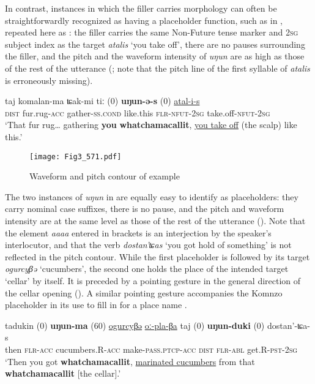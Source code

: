 \documentclass[output=paper]{langscibook}
\begin{document}
In contrast, instances in which the filler carries morphology can often be straightforwardly recognized as having a placeholder function, such as in , repeated here as : the filler carries the same Non-Future tense marker and 2\textsc{sg} subject index as the target \textit{atalis} ‘you take off’, there are no pauses surrounding the filler, and the pitch and the waveform intensity of \textit{uŋun} are as high as those of the rest of the utterance (; note that the pitch line of the first syllable of \textit{atalis} is erroneously missing). 


\ea \label{ex:pakendorf:6}
\gll taj
	komalan-ma
	ʨak-mi
	tiː
	\textup{(0)}
	\textbf{uŋun-ə{}-s}
	\textup{(0)}
	\uline{atal-i-s}\\
	\textsc{dist}
	fur.rug-\textsc{acc}
	gather-\textsc{ss.cond}
	like.this
	{}
	\textsc{flr-nfut-2sg}
	{}
	take.off-\textsc{nfut-2sg}\\
\glt ‘That fur rug… gathering \textbf{you} \textbf{whatchamacallit}, \uline{you take off} (the scalp) like this.’ 
\z

\begin{figure}
\texttt{[image: Fig3\_571.pdf]}
\caption{Waveform and pitch contour of example }
\label{fig:pakendorf:3}
\end{figure}

The two instances of \textit{uŋun} in  are equally easy to identify as placeholders: they carry nominal case suffixes, there is no pause, and the pitch and waveform intensity are at the same level as those of the rest of the utterance (). Note that the element \textit{aaaa} entered in brackets is an interjection by the speaker’s interlocutor, and that the verb \textit{dostan’ʨas} ‘you got hold of something’ is not reflected in the pitch contour. While the first placeholder is followed by its target \textit{ogurcyβə} ‘cucumbers’, the second one holds the place of the intended target ‘cellar’ by itself. It is preceded by a pointing gesture in the general direction of the cellar opening (). A similar pointing gesture accompanies the Komnzo placeholder in its use to fill in for a place name .


\ea \label{ex:pakendorf:7}
\gll tadukin
	\textup{(0)}
	\textbf{uŋun-ma}
	\textup{(60)}
	\uline{ogurcyβə}
	\uline{oː-pla-βa}
	taj
	\textup{(0)}
	\textbf{uŋun-duki}
	\textup{(0)}
	dostan'-ʨa-s\\
	then
	{}
	\textsc{flr-acc}
	{}
	cucumbers.R-\textsc{acc}
	make-\textsc{pass.ptcp-acc}
	\textsc{dist}
	{}
	\textsc{flr}-\textsc{abl}
	{}
	get.R-\textsc{pst-2sg}\\
\glt ‘Then you got \textbf{whatchamacallit},  \uline{marinated cucumbers} from that \textbf{whatchamacallit} [the cellar].’ 
\z
\end{document}
